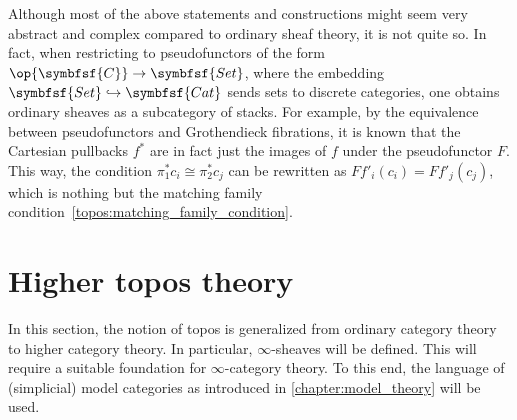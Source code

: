        \begin{remark}[1-sheaves]
            Although most of the above statements and constructions might seem very abstract and complex compared to ordinary sheaf theory, it is not quite so. In fact, when restricting to pseudofunctors of the form $\op{\symbfsf{C}}\rightarrow\symbfsf{Set}$, where the embedding $\symbfsf{Set}\hookrightarrow\symbfsf{Cat}$ sends sets to discrete categories, one obtains ordinary sheaves as a subcategory of stacks. For example, by the equivalence between pseudofunctors and Grothendieck fibrations, it is known that the Cartesian pullbacks $f^*$ are in fact just the images of $f$ under the pseudofunctor $F$. This way, the condition $\pi_1^*c_i\cong\pi^*_2c_j$ can be rewritten as $Ff'_i(c_i)=Ff'_j(c_j)$, which is nothing but the matching family condition~\eqref{topos:matching_family_condition}.
        \end{remark}
    
    \section{Higher topos theory}
    
        In this section, the notion of topos is generalized from ordinary category theory to higher category theory. In particular, $\infty$-sheaves will be defined. This will require a suitable foundation for $\infty$-category theory. To this end, the language of (simplicial) model categories as introduced in \cref{chapter:model_theory} will be used.
    
    
